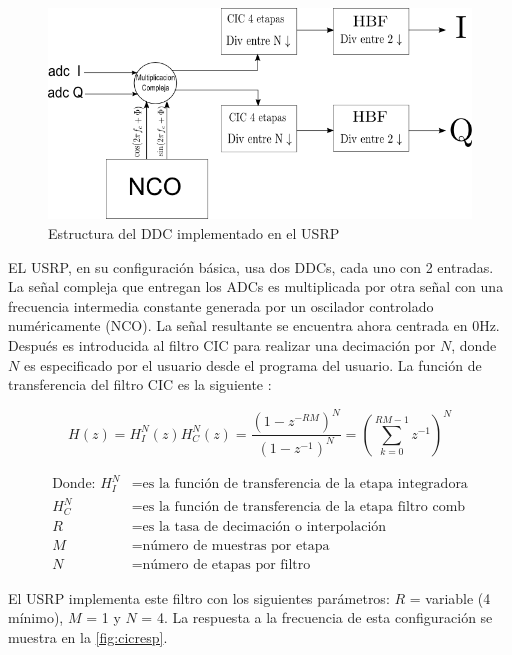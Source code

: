 \begin{figure}[htp]
\centering
	\includegraphics[width=5.5in]{figs/ddc}
	\vspace{0.3in}
	\caption{Estructura del DDC implementado en el USRP}
	\label{fig:ddcblock}
\end{figure}

EL USRP, en su configuraci\'on b\'asica, usa dos DDCs, cada uno con 2
entradas. La se\~nal compleja que entregan los ADCs es multiplicada por otra se\~nal con una
frecuencia intermedia constante generada por un oscilador controlado num\'ericamente (NCO).  La
se\~nal resultante se encuentra ahora centrada en 0Hz. Despu\'es es introducida al filtro CIC para
realizar una decimaci\'on por $N$, donde $N$ es especificado por el usuario desde el programa
del usuario. La funci\'on de transferencia del filtro CIC es la siguiente
\cite{cic}:

\begin{equation}
H(z)=H_I^N(z)H_C^N(z)=\frac{(1-z^{-RM})^N}{(1-z^{-1})^N}=\left(\sum_{k=0}^{RM-1}z^{-1}\right)^N
\end{equation}

\begin{equation*}
\begin{aligned}
\text{Donde: }H_I^N&=\text{es la funci\'on de transferencia de la etapa
integradora}\\
H_C^N&=\text{es la funci\'on de transferencia de la etapa filtro comb}\\
R&=\text{es la tasa de decimaci\'on o interpolaci\'on}\\
M&=\text{n\'umero de muestras por etapa}\\
N&=\text{n\'umero de etapas por filtro}
\end{aligned}
\end{equation*}

El USRP implementa este filtro con los siguientes par\'ametros: $R$ = variable (4 m\'inimo), $M$ = 1
y $N$ = 4. La respuesta a la frecuencia de esta configuraci\'on se muestra en la
\ref{fig:cicresp}.

